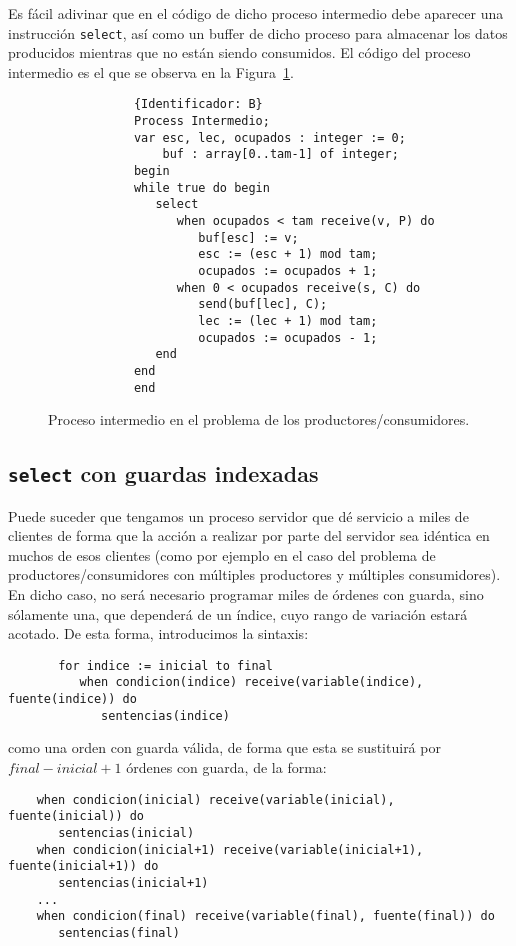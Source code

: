 \begin{ejemplo}
    Es fácil adivinar que en el código de dicho proceso intermedio debe aparecer una instrucción \verb|select|, así como un buffer de dicho proceso para almacenar los datos producidos mientras que no están siendo consumidos. El código del proceso intermedio es el que se observa en la Figura~\ref{fig:prod_cons_intermedio}.
    \begin{figure}[H]
        \centering
        \begin{verbatim}
            {Identificador: B}
            Process Intermedio;
            var esc, lec, ocupados : integer := 0;
                buf : array[0..tam-1] of integer;
            begin
            while true do begin
               select
                  when ocupados < tam receive(v, P) do
                     buf[esc] := v;
                     esc := (esc + 1) mod tam;
                     ocupados := ocupados + 1;
                  when 0 < ocupados receive(s, C) do
                     send(buf[lec], C);
                     lec := (lec + 1) mod tam;
                     ocupados := ocupados - 1;
               end
            end
            end
        \end{verbatim}
        \caption{Proceso intermedio en el problema de los productores/consumidores.}
        \label{fig:prod_cons_intermedio}
    \end{figure}
\end{ejemplo}

\subsection{\texttt{select} con guardas indexadas}
Puede suceder que tengamos un proceso servidor que dé servicio a miles de clientes de forma que la acción a realizar por parte del servidor sea idéntica en muchos de esos clientes (como por ejemplo en el caso del problema de productores/consumidores con múltiples productores y múltiples consumidores).\\

En dicho caso, no será necesario programar miles de órdenes con guarda, sino sólamente una, que dependerá de un índice, cuyo rango de variación estará acotado. De esta forma, introducimos la sintaxis:
\begin{verbatim}
       for indice := inicial to final
          when condicion(indice) receive(variable(indice), fuente(indice)) do
             sentencias(indice)
\end{verbatim}
como una orden con guarda válida, de forma que esta se sustituirá por $final-inicial+1$ órdenes con guarda, de la forma:
\begin{verbatim}
    when condicion(inicial) receive(variable(inicial), fuente(inicial)) do
       sentencias(inicial)
    when condicion(inicial+1) receive(variable(inicial+1), fuente(inicial+1)) do
       sentencias(inicial+1)
    ...
    when condicion(final) receive(variable(final), fuente(final)) do
       sentencias(final)
\end{verbatim}

